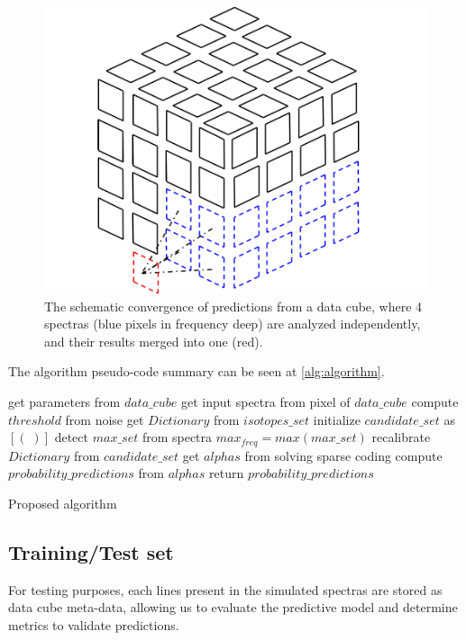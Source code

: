 \begin{figure}[H]
	\begin{center}
		\includegraphics[width=0.333 \textwidth]{images/probabilities}
		\caption{The schematic convergence of predictions from a data cube, where 4 spectras (blue pixels in frequency deep) are analyzed independently, and their results merged into one (red).}
		\label{fig:probabilities}
	\end{center}
\end{figure}

The algorithm pseudo-code summary can be seen at \ref{alg:algorithm}.

\begin{algorithm}[H]
            get parameters from $data\_cube$\;
            get input spectra from pixel of $data\_cube$\;
            compute $threshold$ from noise\;
            get $Dictionary$ from $isotopes\_set$\;
            initialize $candidate\_set$ as $[(\;)]$\;
            detect $max\_set$ from spectra\;
            $max_{freq} = max(max\_set)$\;
            recalibrate $Dictionary$ from $candidate\_set$\;
            get $alphas$ from solving sparse coding\;
            compute $probability\_predictions$ from $alphas$\;
            return $probability\_predictions$\;
    \caption{Proposed algorithm}
   	\label{alg:algorithm}
\end{algorithm}


\subsection{Training/Test set}
For testing purposes, each lines present in the simulated spectras are stored as data cube meta-data, allowing us to evaluate the predictive model and determine metrics to validate predictions.

